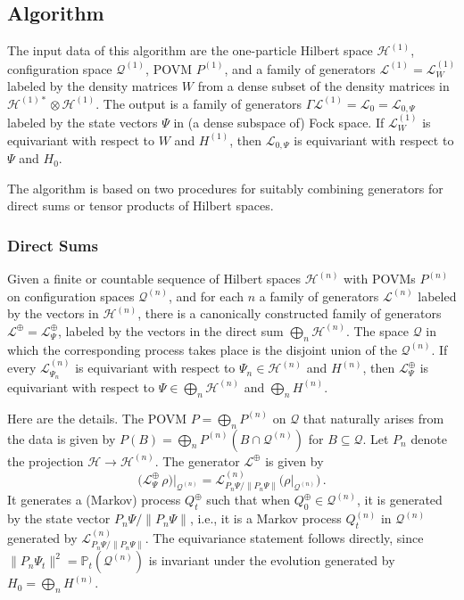 \documentclass[12pt]{article}
\newcommand{\1}{\mathbf{1}} %
\newcommand{\Hilbert}{\mathscr{H}}
\newcommand{\conf}{\mathcal{Q}} %
\newcommand{\measure}{\mathbb{P}} %
\newcommand{\generator}{\mathscr{L}} %
\newcommand{\pov}{{P}}%
\begin{document}
\subsection{Algorithm}
\label{sec:Gamma}

The input data of this algorithm are the one-particle Hilbert space
$\Hilbert^{(1)}$, configuration space $\conf^{(1)}$, POVM
$\pov^{(1)}$, and a family of generators $\generator^{(1)} =
\generator^{(1)}_W$ labeled by the density matrices $W$ from a dense
subset of the density matrices in $\Hilbert^{(1)*} \otimes
\Hilbert^{(1)}$.  The output is a family of generators $\Gamma
\generator^{(1)} = \generator_0 = \generator_{0,\Psi}$ labeled by the
state vectors $\Psi$ in (a dense subspace of) Fock space. If
$\generator^{(1)}_W$ is equivariant with respect to $W$ and $H^{(1)}$,
then $\generator_{0,\Psi}$ is equivariant with respect to $\Psi$ and
$H_0$.

The algorithm is based on two procedures for suitably combining
generators for direct sums or tensor products of Hilbert spaces.

\subsubsection{Direct Sums}\label{sec:directsum}

   Given a finite or countable sequence of Hilbert
   spaces $\Hilbert^{(n)}$ with POVMs $\pov^{(n)}$ on configuration
   spaces $\conf^{(n)}$, and for each $n$ a family of generators
   $\generator^{(n)}$ labeled by the vectors in $\Hilbert^{(n)}$, there
   is a canonically constructed family of generators $\generator^\oplus
   = \generator^\oplus_\Psi$, labeled by the vectors in the direct sum
   $\bigoplus_n \Hilbert^{(n)}$. The space $\conf$ in which the
   corresponding process takes place is the disjoint union of the
   $\conf^{(n)}$. If every $\generator^{(n)}_{\Psi_n}$ is equivariant
   with respect to $\Psi_n \in \Hilbert^{(n)}$ and $H^{(n)}$, then
   $\generator^\oplus_\Psi$ is equivariant with respect to $\Psi \in
   \bigoplus_n \Hilbert^{(n)}$ and $\bigoplus_n H^{(n)}$.

   Here are the details. The POVM $\pov = \bigoplus_n \pov^{(n)}$ on
   $\conf$ that naturally arises from the data is given by $\pov(B) =
   \bigoplus_n \pov^{(n)} (B \cap \conf^{(n)})$ for $B \subseteq
   \conf$.  Let $P_n$ denote the projection $\Hilbert \to
   \Hilbert^{(n)}$.  The generator $\generator^\oplus$ is given by
   \begin{equation}
     \big( \generator_\Psi^\oplus \, \rho \big) \big|_{\conf^{(n)}} =
     \generator_{P_n\Psi/\|P_n\Psi\|}^{(n)} \big(
     \rho \big|_{\conf^{(n)}} \big)\,.
   \end{equation}
   It generates a (Markov) process $Q_t^\oplus$ such that when
   $Q_0^\oplus \in \conf^{(n)}$, it is generated by the state vector
   $P_n \Psi/ \|P_n \Psi \|$, i.e., it is a Markov process $Q_t^{(n)}$
   in $\conf^{(n)}$ generated by $\generator^{(n)}_{P_n \Psi/
   \|P_n\Psi\|}$.  The equivariance statement follows directly, since
   $\|P_n \Psi_t\|^2 = \measure_t (\conf^{(n)})$  is invariant under the
   evolution generated by $H_0 = \bigoplus_n H^{(n)}$.
\end{document}
